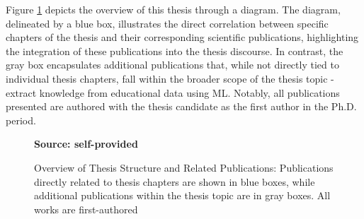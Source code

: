 Figure \ref{fig:thesis_flow} depicts the overview of this thesis through a diagram. The diagram, delineated by a blue box, illustrates the direct correlation between specific chapters of the thesis and their corresponding scientific publications, highlighting the integration of these publications into the thesis discourse. In contrast, the gray box encapsulates additional publications that, while not directly tied to individual thesis chapters, fall within the broader scope of the thesis topic - extract knowledge from educational data using ML. Notably, all publications presented are authored with the thesis candidate as the first author in the Ph.D. period.

\begin{figure}[ht!]
\centering
\caption{\textmd{Overview of Thesis Structure and Related Publications: Publications directly related to thesis chapters are shown in blue boxes, while additional publications within the thesis topic are in gray boxes. All works are first-authored}}
\label{fig:thesis_flow}
\par\medskip\ABNTEXfontereduzida\selectfont\textbf{Source: self-provided}  
\par\medskip
\end{figure}